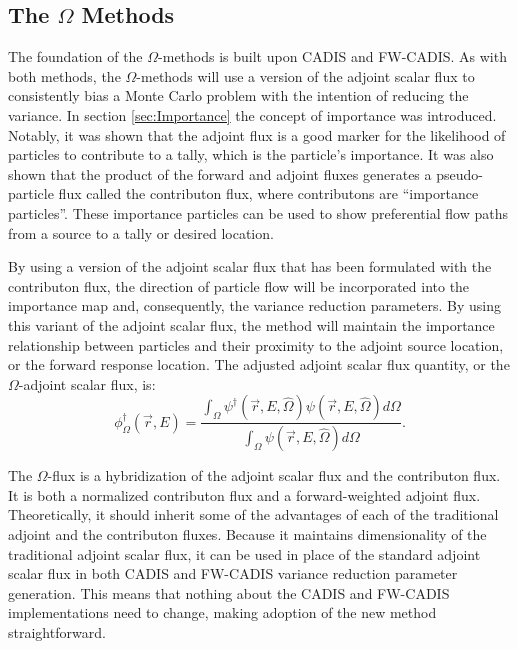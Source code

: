 \subsection{The $\Omega$ Methods}
\label{sec:omegaintro}

The foundation of the $\Omega$-methods is built upon CADIS and FW-CADIS. As with
both methods,
the $\Omega$-methods will use a version of the adjoint scalar flux to
consistently bias a Monte Carlo problem with the intention of reducing the
variance. In section \ref{sec:Importance} the concept of importance was
introduced. Notably, it was shown that the adjoint flux is a good marker 
for the likelihood of particles to contribute to a tally, which is the
particle's importance. It was also shown that the
product of the forward and adjoint fluxes generates a pseudo-particle flux called
the contributon flux, where contributons are ``importance particles''.
These importance particles can be used to show preferential flow paths from a
source to a tally or desired location.

By using a version of the adjoint scalar flux that has been formulated with the
contributon flux, the direction of particle flow will be incorporated into the
importance map and, consequently, the
variance reduction parameters. By using this variant of the adjoint scalar flux,
the method will maintain the importance relationship between particles and
their proximity to the adjoint source location, or the forward response
location. 
The adjusted adjoint scalar flux quantity, or the $\Omega$-adjoint
scalar flux, is:
%
\begin{equation}
  \phi^{\dagger}_{\Omega}(\vec {r} ,E)  = \frac{\int_{\Omega}{\psi^{\dagger}
                             (\vec{r}, E, \hat\Omega)
                             \psi(\vec{r}, E, \hat\Omega)} d\Omega}
                             {\int_{\Omega}\psi(\vec{r}, E, \hat\Omega)
                           d\Omega}.
\label{eq:omega_basic}
\end{equation}

The $\Omega$-flux is a hybridization of the adjoint scalar flux and the contributon
flux. It is both a normalized contributon flux and a forward-weighted
adjoint flux. Theoretically, it should inherit some of the advantages of
each of the traditional
adjoint and the contributon fluxes. Because it maintains dimensionality of the
traditional adjoint scalar flux, it can be used in place of the standard adjoint
scalar flux in both
CADIS and FW-CADIS variance reduction parameter generation. 
This means that nothing about the CADIS and FW-CADIS implementations need to 
change, making adoption of the new method straightforward.


